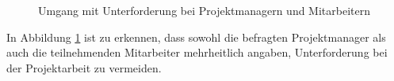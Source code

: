 \begin{figure}[h]
	\centering
	
	
	\caption{Umgang mit Unterforderung bei Projektmanagern und Mitarbeitern}
	\label{fig:ergebnisse:fallstudie:kurven:abb1}
\end{figure}

In Abbildung \ref{fig:ergebnisse:fallstudie:kurven:abb1} ist zu erkennen, dass sowohl die befragten Projektmanager als auch die teilnehmenden Mitarbeiter mehrheitlich angaben, Unterforderung bei der Projektarbeit zu vermeiden.
